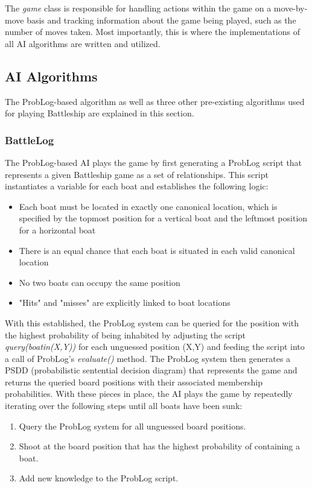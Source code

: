 \documentclass[]{article}
\begin{document}
The \textit{game} class is responsible for handling actions within the game on a move-by-move basis and tracking information about the game being played, such as the number of moves taken. Most importantly, this is where the implementations of all AI algorithms are written and utilized. 

\subsection{AI Algorithms}

The ProbLog-based algorithm as well as three other pre-existing algorithms used for playing Battleship are explained in this section.

\subsubsection{BattleLog}

The ProbLog-based AI plays the game by first generating a ProbLog script that represents a given Battleship game as a set of relationships.  This script instantiates a variable for each boat and establishes the following logic: 

\begin{itemize}
	\item Each boat must be located in exactly one canonical location, which is specified by the topmost position for a vertical boat and the leftmost position for a horizontal boat
	\item There is an equal chance that each boat is situated in each valid canonical location
	\item No two boats can occupy the same position
	\item "Hits" and "misses" are explicitly linked to boat locations
\end{itemize}

With this established, the ProbLog system can be queried for the position with the highest probability of being inhabited by adjusting the script \textit{query(boat\textunderscore in(X,Y))} for each unguessed position (X,Y) and feeding the script into a call of ProbLog's \textit{evaluate()} method.  The ProbLog system then generates a PSDD (probabilistic sentential decision diagram) that represents the game and returns the queried board positions with their associated membership probabilities. With these pieces in place, the AI plays the game by repeatedly iterating over the following steps until all boats have been sunk:

\begin{enumerate}
	\item Query the ProbLog system for all unguessed board positions.
	\item Shoot at the board position that has the highest probability of containing a boat.
	\item Add new knowledge to the ProbLog script.
\end{enumerate}
\end{document}
